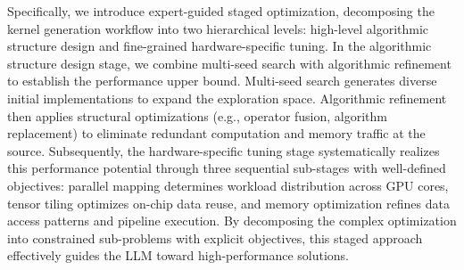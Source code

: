 Specifically, we introduce expert-guided staged optimization, decomposing the kernel generation workflow into two hierarchical levels: high-level algorithmic structure design and fine-grained hardware-specific tuning. In the algorithmic structure design stage, we combine multi-seed search with algorithmic refinement to establish the performance upper bound. Multi-seed search generates diverse initial implementations to expand the exploration space. Algorithmic refinement then applies structural optimizations (e.g., operator fusion, algorithm replacement) to eliminate redundant computation and memory traffic at the source.
Subsequently, the hardware-specific tuning stage systematically realizes this performance potential through three sequential sub-stages with well-defined objectives: parallel mapping determines workload distribution across GPU cores, tensor tiling optimizes on-chip data reuse, and memory optimization refines data access patterns and pipeline execution. By decomposing the complex optimization into constrained sub-problems with explicit objectives, this staged approach effectively guides the LLM toward high-performance solutions. 


